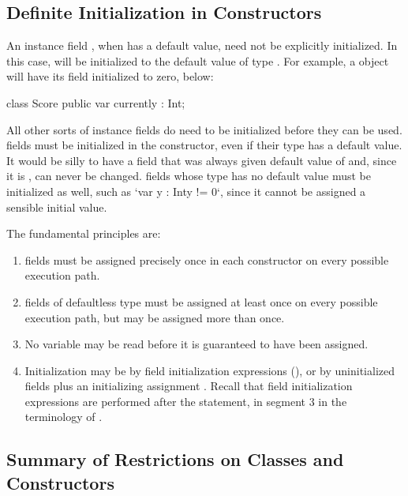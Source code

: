 \subsection{Definite Initialization in Constructors}


An instance field , when  has a default value, need not be
explicitly initialized.  In this case,  will be initialized to the
default value of type .  For example, a  object will have
its  field initialized to zero, below:
\begin{xten}
class Score {
  public var currently : Int;
}
\end{xten}
%

All other sorts of instance fields do need to be initialized before they can
be used.   fields must be initialized in the constructor, even if
their type has a 
default value.  It would be silly to have a field  that was
always given default value of  and, since it is , can never be
changed.   fields whose type has no default value must be initialized
as well, such as \xcd`var y : Int{y != 0}`, since it cannot be assigned a
sensible initial value.

The fundamental principles are:
\begin{enumerate}
\item {} fields must be assigned precisely once in each constructor on every
possible execution path.
\item {} fields of defaultless type must be
assigned at least once on every possible execution path, but may be assigned
more than once.
\item No variable may be read before it is guaranteed to have been
assigned.
\item Initialization may be by field initialization expressions (), or by uninitialized fields  plus
an initializing assignment .  Recall that field initialization
expressions are performed after the  statement, in segment 3 in
the terminology of .
\end{enumerate}



\subsection{Summary of Restrictions on Classes and Constructors}

